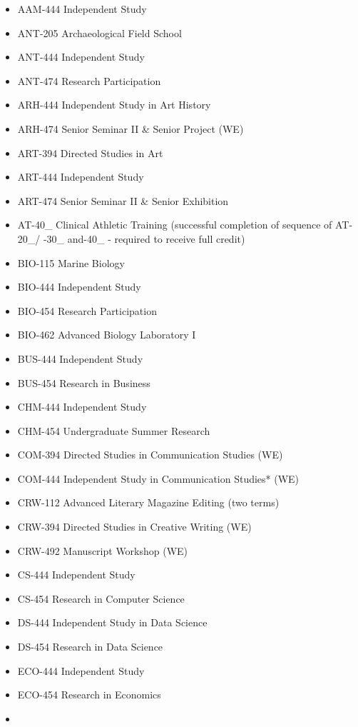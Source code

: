 \documentclass[
  letterpaper,
]{scrbook}
\providecommand{\tightlist}{%
  \setlength{\itemsep}{0pt}\setlength{\parskip}{0pt}}
\begin{document}
\begin{itemize}
\tightlist
\item
  AAM-444 Independent Study
\item
  ANT-205 Archaeological Field School
\item
  ANT-444 Independent Study
\item
  ANT-474 Research Participation
\item
  ARH-444 Independent Study in Art History
\item
  ARH-474 Senior Seminar II \& Senior Project (WE)
\item
  ART-394 Directed Studies in Art
\item
  ART-444 Independent Study
\item
  ART-474 Senior Seminar II \& Senior Exhibition
\item
  AT-40\_ Clinical Athletic Training (successful completion of sequence
  of AT-20\_/ -30\_ and-40\_ - required to receive full credit)
\item
  BIO-115 Marine Biology
\item
  BIO-444 Independent Study
\item
  BIO-454 Research Participation
\item
  BIO-462 Advanced Biology Laboratory I
\item
  BUS-444 Independent Study
\item
  BUS-454 Research in Business
\item
  CHM-444 Independent Study
\item
  CHM-454 Undergraduate Summer Research
\item
  COM-394 Directed Studies in Communication Studies (WE)
\item
  COM-444 Independent Study in Communication Studies* (WE)
\item
  CRW-112 Advanced Literary Magazine Editing (two terms)
\item
  CRW-394 Directed Studies in Creative Writing (WE)
\item
  CRW-492 Manuscript Workshop (WE)
\item
  CS-444 Independent Study
\item
  CS-454 Research in Computer Science
\item
  DS-444 Independent Study in Data Science
\item
  DS-454 Research in Data Science
\item
  ECO-444 Independent Study
\item
  ECO-454 Research in Economics
\item

\end{itemize}
\end{document}
